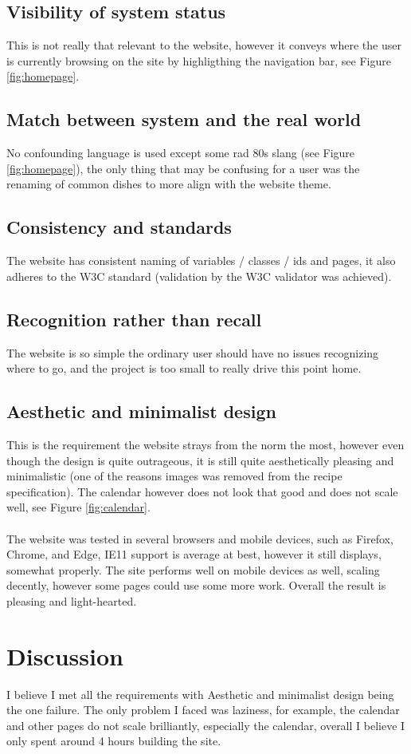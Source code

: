 \documentclass[a4paper]{scrartcl}
\begin{document}
\subsection{Visibility of system status}
This is not really that relevant to the website, however it conveys where the user
is currently browsing on the site by highligthing the navigation bar, see Figure \ref{fig:homepage}.
\subsection{Match between system and the real world}
No confounding language is used except some rad 80s slang (see Figure \ref{fig:homepage}),
the only thing that may be confusing for a user was the renaming of common dishes
to more align with the website theme.
\subsection{Consistency and standards}
The website has consistent naming of variables / classes / ids and pages, it also
adheres to the W3C standard (validation by the W3C validator was achieved).
\subsection{Recognition rather than recall}
The website is so simple the ordinary user should have no issues recognizing where to go,
and the project is too small to really drive this point home.
\subsection{Aesthetic and minimalist design}
This is the requirement the website strays from the norm the most, however
even though the design is quite outrageous, it is still quite aesthetically pleasing and
minimalistic (one of the reasons images was removed from the recipe specification).
The calendar however does not look that good and does not scale well, see Figure \ref{fig:calendar}.
\\\\
\noindent
The website was tested in several browsers and mobile devices, such as Firefox, Chrome, and Edge,
IE11 support is average at best, however it still displays, somewhat properly.
The site performs well on mobile devices as well, scaling decently, however some
pages could use some more work.
Overall the result is pleasing and light-hearted.
\newpage
\section{Discussion}
\noindent
I believe I met all the requirements with Aesthetic and minimalist design being the one failure.
The only problem I faced was laziness, for example, the calendar and other pages do not scale
brilliantly, especially the calendar, overall I believe I only spent around 4 hours building the site.\\\\
\end{document}
